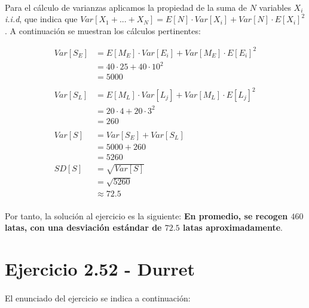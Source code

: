\documentclass[a4paper, spanish]{article}
\begin{document}
    \paragraph{}
    Para el cálculo de varianzas aplicamos la propiedad de la suma de $N$ variables $X_i$ \emph{i.i.d}, que indica que $Var[X_1 + ... + X_N] = E[N] \cdot Var[X_i] + Var[N] \cdot E[X_i]^2$. A continuación se muestran los cálculos pertinentes:

    \begin{align*}
      Var[S_E]
      &= E[M_E] \cdot Var[E_i] + Var[M_E] \cdot E[E_i]^2 \\
      &= 40 \cdot 25 + 40 \cdot 10 ^ 2 \\
      &= 5000\\
      \\
      Var[S_L]
      &= E[M_L] \cdot Var[L_j] + Var[M_L] \cdot E[L_j]^2 \\
      &= 20  \cdot 4 + 20 \cdot 3 ^ 2\\
      &= 260 \\ 
      \\
      Var[S]
      &= Var[S_E] + Var[S_L] \\
      &= 5000 + 260 \\
      &= 5260
      \\
      SD[S]
      &= \sqrt{Var[S]} \\
      &= \sqrt{5260} \\
      &\approx 72.5
    \end{align*}

    \paragraph{}
    Por tanto, la solución al ejercicio es la siguiente: \textbf{En promedio, se recogen $460$ latas, con una desviación estándar de $72.5$ latas aproximadamente}.

  \section{Ejercicio 2.52 - Durret}

  \paragraph{}
  El enunciado del ejercicio se indica a continuación:

  \begin{displayquote}
  \end{displayquote}
\end{document}
